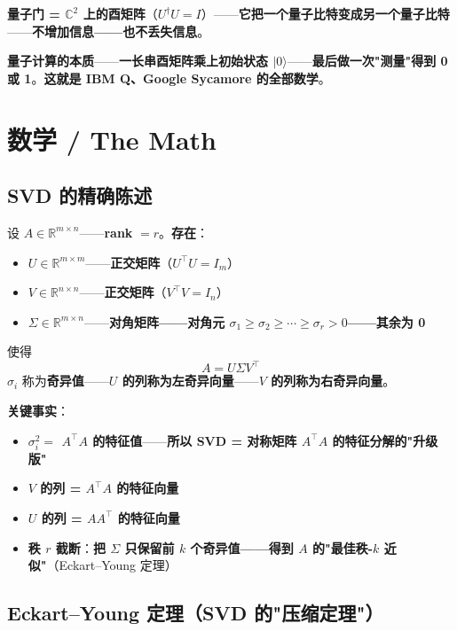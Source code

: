 \textbf{量子门 = $\mathbb{C}^2$ 上的酉矩阵}（$U^\dagger U = I$）——\textbf{它把一个量子比特变成另一个量子比特}——\textbf{不增加信息——也不丢失信息}。

\textbf{量子计算的本质}——\textbf{一长串酉矩阵乘上初始状态 $|0\rangle$}——\textbf{最后做一次"测量"得到 0 或 1}。\textbf{这就是 IBM Q、Google Sycamore 的全部数学}。

\section{数学 / The Math}

\subsection{SVD 的精确陈述}

\begin{theorem}[SVD 定理]
设 $A \in \mathbb{R}^{m \times n}$——\textbf{rank} $= r$。\textbf{存在}：
\begin{itemize}
\item \textbf{$U \in \mathbb{R}^{m \times m}$}——\textbf{正交矩阵}（$U^{\!\top} U = I_m$）
\item \textbf{$V \in \mathbb{R}^{n \times n}$}——\textbf{正交矩阵}（$V^{\!\top} V = I_n$）
\item \textbf{$\Sigma \in \mathbb{R}^{m \times n}$}——\textbf{对角矩阵——对角元 $\sigma_1 \ge \sigma_2 \ge \cdots \ge \sigma_r > 0$——其余为 0}
\end{itemize}
使得
\[
A = U \Sigma V^{\!\top}
\]
$\sigma_i$ 称为\textbf{奇异值}——\textbf{$U$ 的列称为左奇异向量}——\textbf{$V$ 的列称为右奇异向量}。
\end{theorem}

\textbf{关键事实}：
\begin{itemize}
\item \textbf{$\sigma_i^2 = $ $A^{\!\top} A$ 的特征值}——\textbf{所以 SVD = 对称矩阵 $A^{\!\top} A$ 的特征分解的"升级版"}
\item \textbf{$V$ 的列 = $A^{\!\top} A$ 的特征向量}
\item \textbf{$U$ 的列 = $A A^{\!\top}$ 的特征向量}
\item \textbf{秩 $r$ 截断}：\textbf{把 $\Sigma$ 只保留前 $k$ 个奇异值——得到 $A$ 的"最佳秩-$k$ 近似"}（Eckart--Young 定理）
\end{itemize}

\subsection{Eckart--Young 定理（SVD 的"压缩定理"）}

